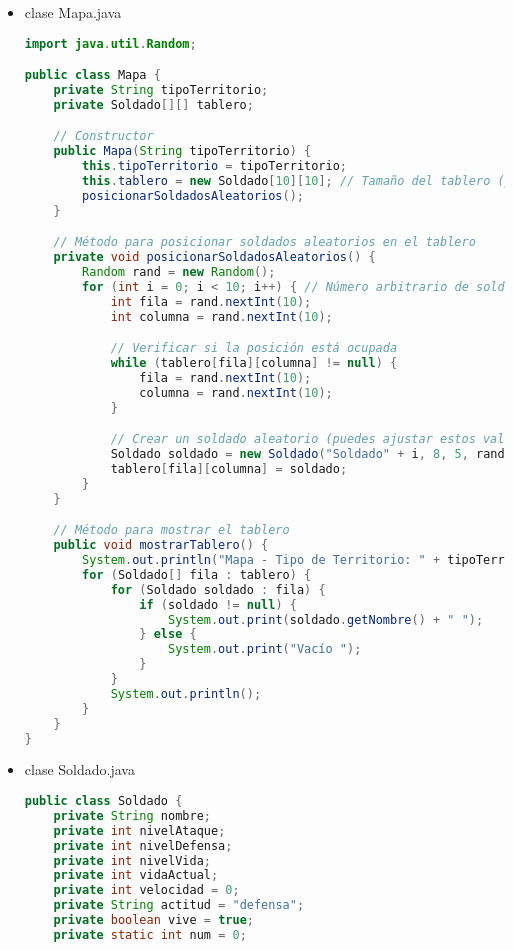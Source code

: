 \documentclass{article}
\begin{document}
\begin{itemize}
        \item clase Mapa.java
        \begin{lstlisting}[language=java]
import java.util.Random;

public class Mapa {
    private String tipoTerritorio;
    private Soldado[][] tablero;

    // Constructor
    public Mapa(String tipoTerritorio) {
        this.tipoTerritorio = tipoTerritorio;
        this.tablero = new Soldado[10][10]; // Tamaño del tablero (puedes ajustarlo según tus necesidades)
        posicionarSoldadosAleatorios();
    }

    // Método para posicionar soldados aleatorios en el tablero
    private void posicionarSoldadosAleatorios() {
        Random rand = new Random();
        for (int i = 0; i < 10; i++) { // Número arbitrario de soldados por ejército
            int fila = rand.nextInt(10);
            int columna = rand.nextInt(10);

            // Verificar si la posición está ocupada
            while (tablero[fila][columna] != null) {
                fila = rand.nextInt(10);
                columna = rand.nextInt(10);
            }

            // Crear un soldado aleatorio (puedes ajustar estos valores según tus necesidades)
            Soldado soldado = new Soldado("Soldado" + i, 8, 5, rand.nextInt(5) + 5);
            tablero[fila][columna] = soldado;
        }
    }

    // Método para mostrar el tablero
    public void mostrarTablero() {
        System.out.println("Mapa - Tipo de Territorio: " + tipoTerritorio);
        for (Soldado[] fila : tablero) {
            for (Soldado soldado : fila) {
                if (soldado != null) {
                    System.out.print(soldado.getNombre() + " ");
                } else {
                    System.out.print("Vacío ");
                }
            }
            System.out.println();
        }
    }
}
        \end{lstlisting}

        \item clase Soldado.java
        \begin{lstlisting}[language=java]
public class Soldado {
	private String nombre;
    private int nivelAtaque;
    private int nivelDefensa;
    private int nivelVida;
    private int vidaActual;
    private int velocidad = 0;
    private String actitud = "defensa";
    private boolean vive = true;
    private static int num = 0;
	

\end{lstlisting}
\end{itemize}
\end{document}

